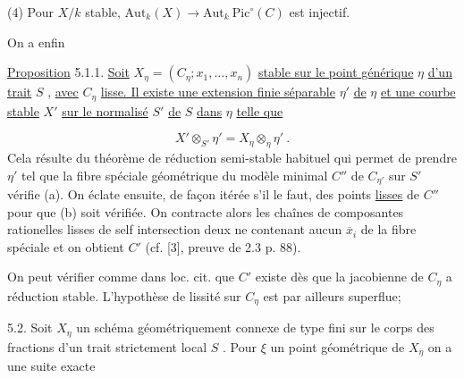 (4) Pour  $X/k$  stable,  $\mathrm{Aut}_k(X) \longrightarrow \mathrm{Aut}_k\ \mathrm{Pic}^{\circ}(C)$  est injectif.

On a enfin

\underline{Proposition} 5.1.1.  \underline{Soit}  $X_\eta = (C_\eta ; x_1, \ldots, x_n)$  \underline{stable sur le point générique}  $\eta$ \underline{d'un trait}  $S$ , \underline{avec}  $C_\eta$  \underline{lisse. Il existe une extension finie séparable}  $\eta'$  \underline{de}  $\eta$ \underline{et une courbe stable}  $X'$  \underline{sur le normalisé}  $S'$  \underline{de}  $S$  \underline{dans}  $\eta$  \underline{telle que}

\begin{equation*}
X' \otimes_{S'} \eta' = X_{\eta} \otimes_{\eta} \eta' \ .
\end{equation*}
Cela résulte du théorème de réduction semi-stable habituel qui permet de prendre  $\eta'$  tel que la fibre spéciale géométrique du modèle minimal  $C''$  de  $C_{\eta'}$ sur  $S'$  vérifie (a). On éclate ensuite, de façon itérée s'il le faut, des points \underline{lisses} de  $C''$  pour que  (b) soit vérifiée. On contracte alors les chaînes de composantes rationelles lisses de self intersection deux ne contenant aucun  $\overline{x}_i$  de la fibre spéciale et on obtient  $C'$  (cf. [3], preuve de 2.3 p. 88).

On peut vérifier comme dans loc. cit. que  $C'$  existe dès que la jacobienne de  $C_\eta$  a réduction stable. L'hypothèse de lissité sur  $C_\eta$  est par ailleurs superflue;

5.2.  Soit  $X_\eta$  un schéma géométriquement connexe de type fini sur le corps des fractions d'un trait strictement local  $S$ . Pour  $\xi$  un point géométrique de  $X_{\overline{\eta}}$  on a une suite exacte


